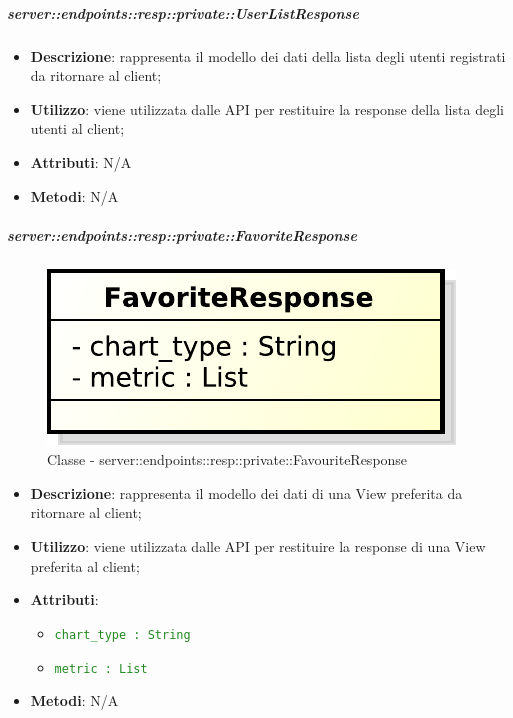     \subparagraph{server::endpoints::resp::private::UserListResponse} %
    \label{subp:bdsm_app_server_endpoints_resp_private_userlistresponse}
    \begin{itemize}
      \item \textbf{Descrizione}: rappresenta il modello dei dati della lista degli utenti registrati da ritornare al client;
      \item \textbf{Utilizzo}: viene utilizzata dalle API per restituire la response della lista degli utenti al client;
    \item \textbf{Attributi}: N/A
    \item \textbf{Metodi}: N/A
    \end{itemize}

    \subparagraph{server::endpoints::resp::private::FavoriteResponse} %
    \label{subp:bdsm_app_server_endpoints_resp_private_favoriteresponse}
  \begin{figure}[!htbp]
    \centering
    \centerline{\includegraphics[scale=0.6]{./images/server/classes/endpoints/favorite_response.pdf}}
    \caption{Classe - server::endpoints::resp::private::FavouriteResponse}
  \end{figure}
    \begin{itemize}
      \item \textbf{Descrizione}: rappresenta il modello dei dati di una View preferita da ritornare al client;
      \item \textbf{Utilizzo}: viene utilizzata dalle API per restituire la response di una View preferita al client;
    \item \textbf{Attributi}:
      \begin{itemize}
        \item \textcolor{forestgreen}{\texttt{chart\_type : String}}
        \item \textcolor{forestgreen}{\texttt{metric : List}}
      \end{itemize}
    \item \textbf{Metodi}: N/A
    \end{itemize}

